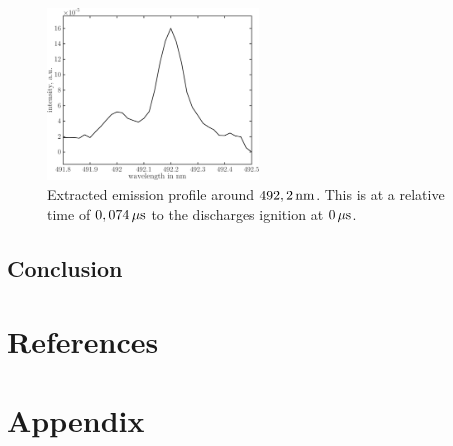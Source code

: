 \documentclass[a4paper,10pt,twoside]{article}
\begin{document}
				\begin{figure}
					\centering
					\includegraphics[width=0.5\textwidth]{figures/stark/stark_shift71in.pdf}
					\caption{Extracted emission profile around $\unit[492,2]{nm}$. This is at a relative time of $\unit[0,074]{\mu s}$ to the discharges ignition at $\unit[0]{\mu s}$.}
					\label{img:starkshift71}
				\end{figure}

		\subsection{Conclusion}
		
	\section{References}

		
		
		
	\section{Appendix}
\end{document}
